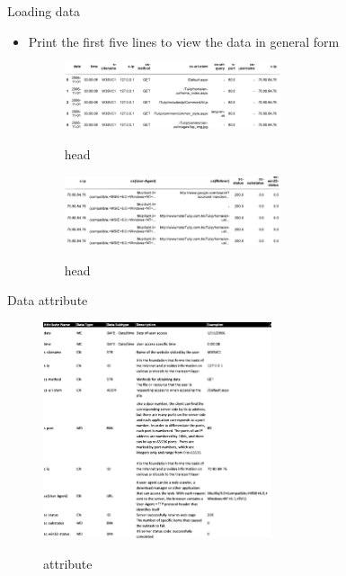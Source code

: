 \documentclass[
 size=14pt,
 paper=smartboard,  %
 mode=present, 		%
 display=slides, 	%
 style=tuliplab,  	%
 pauseslide,
 fleqn,leqno]{powerdot}
\begin{document}
\begin{slide}[toc=,bm=]{Loading data}

\begin{itemize}
\item
Print the first five lines to view the data in general form
\begin{figure}
	\centering
	\includegraphics[width=0.6\textwidth]{Capture2.eps}\\
	\caption{head}\label{fig:timg}
\end{figure}
\begin{figure}
	\centering
	\includegraphics[width=0.6\textwidth]{Capture3.eps}\\
	\caption{head}\label{fig:timg}
\end{figure}
\end{itemize}

\end{slide}


\begin{slide}[toc=,bm=]{Data attribute}
\begin{figure}
	\centering
	\includegraphics[width=0.6\textwidth]{Capture4.eps}\\
	\caption{attribute }\label{fig:timg}
\end{figure}
\end{slide}
\end{document}
